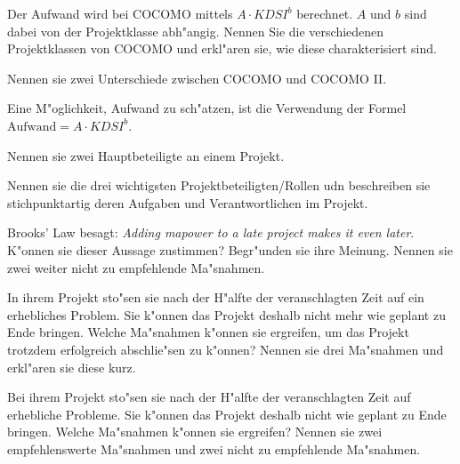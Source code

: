 \documentclass[12pt]{exam}
\begin{document}
\begin{questions}

\question[4.5] Der Aufwand wird bei COCOMO mittels $A \cdot KDSI^b$ berechnet. $A$ und $b$ sind dabei von der Projektklasse abh"angig. Nennen Sie die verschiedenen Projektklassen von COCOMO und erkl"aren sie, wie diese charakterisiert sind.
\addpoints

\question[2] Nennen sie zwei Unterschiede zwischen COCOMO und COCOMO II.
\addpoints

\question[3] Eine M"oglichkeit, Aufwand zu sch"atzen, ist die Verwendung der Formel $\text{Aufwand} = A \cdot KDSI^b$.
\noaddpoints
{}

\question[2] Nennen sie zwei Hauptbeteiligte an einem Projekt.
\addpoints

\question[4.5] Nennen sie die drei wichtigsten Projektbeteiligten/Rollen udn beschreiben sie stichpunktartig deren Aufgaben und Verantwortlichen im Projekt.
\addpoints

\question[4] Brooks' Law besagt: \emph{Adding mapower to a late project makes it even later}. K"onnen sie dieser Aussage zustimmen? Begr"unden sie ihre Meinung. Nennen sie zwei weiter nicht zu empfehlende Ma"snahmen.
\addpoints

\question[6] In ihrem Projekt sto"sen sie nach der H"alfte der veranschlagten Zeit auf ein erhebliches Problem. Sie k"onnen das Projekt deshalb nicht mehr wie geplant zu Ende bringen. Welche Ma"snahmen k"onnen sie ergreifen, um das Projekt trotzdem erfolgreich abschlie"sen zu k"onnen? Nennen sie drei Ma"snahmen und erkl"aren sie diese kurz.
\addpoints

\question[4] Bei ihrem Projekt sto"sen sie nach der H"alfte der veranschlagten Zeit auf erhebliche Probleme. Sie k"onnen das Projekt deshalb nicht wie geplant zu Ende bringen. Welche Ma"snahmen k"onnen sie ergreifen? Nennen sie zwei empfehlenswerte Ma"snahmen und zwei nicht zu empfehlende Ma"snahmen.
\addpoints


\end{questions}
\end{document}

